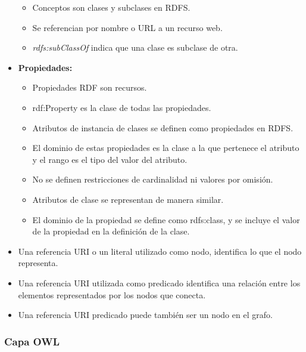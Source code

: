 \documentclass[a4paper,12pt,twoside,final,spanish]{article}
\begin{document}
\begin{itemize}
\begin{itemize}
	\item Conceptos son clases y subclases en RDFS.
	\item Se referencian por nombre o URL a un recurso web.
	\item \textit{rdfs:subClassOf} indica que una clase es subclase de otra.
	\end{itemize}
\item \textbf{Propiedades:}
	\begin{itemize}
	\item Propiedades RDF son recursos.
	\item rdf:Property es la clase de todas las propiedades.
	\item Atributos de instancia de clases se definen como propiedades en RDFS.
	\item El dominio de estas propiedades es la clase a la que pertenece el atributo y 	el rango es el tipo del valor del atributo.
	\item No se definen restricciones de cardinalidad ni valores por omisión.
	\item Atributos de clase se representan de manera similar.
	\item El dominio de la propiedad se define como rdfs:class, y se incluye el valor		de la propiedad en la definición de la clase.
	\end{itemize}
\item Una referencia URI o un literal utilizado como nodo, identifica lo que el nodo representa.
\item Una referencia URI utilizada como predicado identifica una relación entre los elementos representados por los nodos que conecta.
\item Una referencia URI predicado puede también ser un nodo en el grafo.
\end{itemize}

\subsubsection{Capa OWL}
\end{document}
